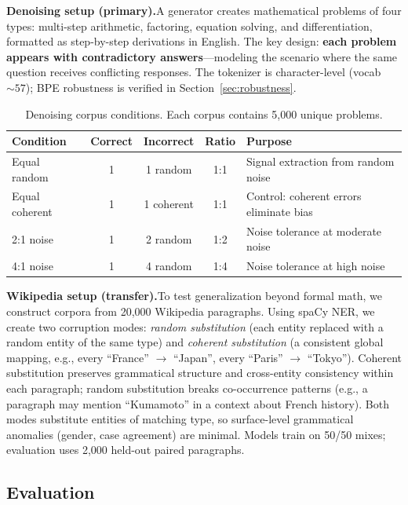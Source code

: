 \documentclass{article}
\begin{document}
\textbf{Denoising setup (primary).}\quad A generator creates mathematical problems of four types: multi-step arithmetic, factoring, equation solving, and differentiation, formatted as step-by-step derivations in English. The key design: \textbf{each problem appears with contradictory answers}---modeling the scenario where the same question receives conflicting responses. The tokenizer is character-level (vocab ${\sim}57$); BPE robustness is verified in Section~\ref{sec:robustness}.

\begin{table}[h]
\centering
\small
\begin{tabular}{lcccp{4.5cm}}
\toprule
Condition & Correct & Incorrect & Ratio & Purpose \\
\midrule
Equal random   & 1 & 1 random   & 1:1 & Signal extraction from random noise \\
Equal coherent & 1 & 1 coherent & 1:1 & Control: coherent errors eliminate bias \\
2:1 noise      & 1 & 2 random   & 1:2 & Noise tolerance at moderate noise \\
4:1 noise      & 1 & 4 random   & 1:4 & Noise tolerance at high noise \\
\bottomrule
\end{tabular}
\caption{Denoising corpus conditions. Each corpus contains 5,000 unique problems.}
\label{tab:conditions}
\end{table}

\textbf{Wikipedia setup (transfer).}\quad To test generalization beyond formal math, we construct corpora from 20,000 Wikipedia paragraphs. Using spaCy NER, we create two corruption modes: \emph{random substitution} (each entity replaced with a random entity of the same type) and \emph{coherent substitution} (a consistent global mapping, e.g., every ``France'' $\to$ ``Japan'', every ``Paris'' $\to$ ``Tokyo''). Coherent substitution preserves grammatical structure and cross-entity consistency within each paragraph; random substitution breaks co-occurrence patterns (e.g., a paragraph may mention ``Kumamoto'' in a context about French history). Both modes substitute entities of matching type, so surface-level grammatical anomalies (gender, case agreement) are minimal. Models train on 50/50 mixes; evaluation uses 2,000 held-out paired paragraphs.

\subsection{Evaluation}
\label{sec:evaluation}
\end{document}
